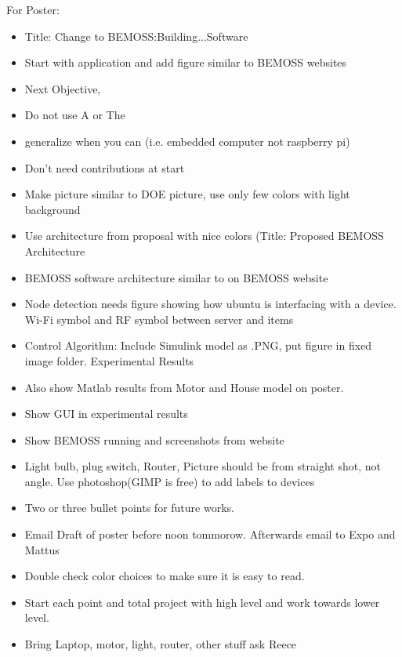 \documentclass[fontsize=11pt, %
                             paper=letter, %
                             twoside, %
                             captions=tableheading,
                             index=totoc,
                             hyperref]{labbook}
\begin{document}
For Poster:
\begin{itemize}
    \item Title: Change to BEMOSS:Building...Software
    \item Start with application and add figure similar to BEMOSS websites
    \item Next Objective, 
    \item Do not use A or The
    \item generalize when you can (i.e. embedded computer not raspberry pi)
    \item Don't need contributions at start
    \item Make picture similar to DOE picture, use only few colors with light background
    \item Use architecture from proposal with nice colors (Title: Proposed BEMOSS Architecture
    \item BEMOSS software architecture similar to on BEMOSS website
    \item Node detection needs figure showing how ubuntu is interfacing with a device. Wi-Fi symbol and RF symbol between server and items
    \item Control Algorithm: Include Simulink model as .PNG, put figure in fixed image folder. Experimental Results
    \item Also show Matlab results from Motor and House model on poster.
    \item Show GUI in experimental results
    \item Show BEMOSS running and screenshots from website
    \item Light bulb, plug switch, Router, Picture should be from straight shot, not angle. Use photoshop(GIMP is free) to add labels to devices 
    \item Two or three bullet points for future works.
    \item Email Draft of poster before noon tommorow. Afterwards email to Expo and Mattus
    \item Double check color choices to make sure it is easy to read.
    \item Start each point and total project with high level and work towards lower level.
    \item Bring Laptop, motor, light, router, other stuff ask Reece
\end{itemize}





\end{document}
